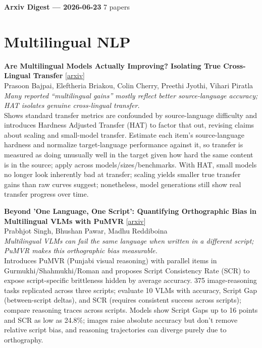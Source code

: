 \documentclass[12pt,letterpaper]{article}
\begin{document}
{\footnotesize\textbf{Arxiv Digest --- 2026-06-23} \hfill 7 papers}

\smallskip

\section*{Multilingual NLP}

{\small\textbf{Are Multilingual Models Actually Improving? Isolating True Cross-Lingual Transfer}} {\scriptsize[\href{https://arxiv.org/abs/2606.21954}{arxiv}]}\\
{\scriptsize Prasoon Bajpai, Eleftheria Briakou, Colin Cherry, Preethi Jyothi, Vihari Piratla}\\

{\small\textit{Many reported ``multilingual gains'' mostly reflect better source-language accuracy; HAT isolates genuine cross-lingual transfer.}}\\[1pt]
{\footnotesize Shows standard transfer metrics are confounded by source-language difficulty and introduces Hardness Adjusted Transfer (HAT) to factor that out, revising claims about scaling and small-model transfer. Estimate each item's source-language hardness and normalize target-language performance against it, so transfer is measured as doing unusually well in the target given how hard the same content is in the source; apply across models/sizes/benchmarks. With HAT, small models no longer look inherently bad at transfer; scaling yields smaller true transfer gains than raw curves suggest; nonetheless, model generations still show real transfer progress over time.}

\medskip

{\small\textbf{Beyond 'One Language, One Script': Quantifying Orthographic Bias in Multilingual VLMs with PuMVR}} {\scriptsize[\href{https://arxiv.org/abs/2606.20770}{arxiv}]}\\
{\scriptsize Prabhjot Singh, Bhushan Pawar, Madhu Reddiboina}\\

{\small\textit{Multilingual VLMs can fail the same language when written in a different script; PuMVR makes this orthographic bias measurable.}}\\[1pt]
{\footnotesize Introduces PuMVR (Punjabi visual reasoning) with parallel items in Gurmukhi/Shahmukhi/Roman and proposes Script Consistency Rate (SCR) to expose script-specific brittleness hidden by average accuracy. 375 image-reasoning tasks replicated across three scripts; evaluate 10 VLMs with accuracy, Script Gap (between-script deltas), and SCR (requires consistent success across scripts); compare reasoning traces across scripts. Models show Script Gaps up to 16 points and SCR as low as 24.8\%; images raise absolute accuracy but don't remove relative script bias, and reasoning trajectories can diverge purely due to orthography.}
\end{document}
